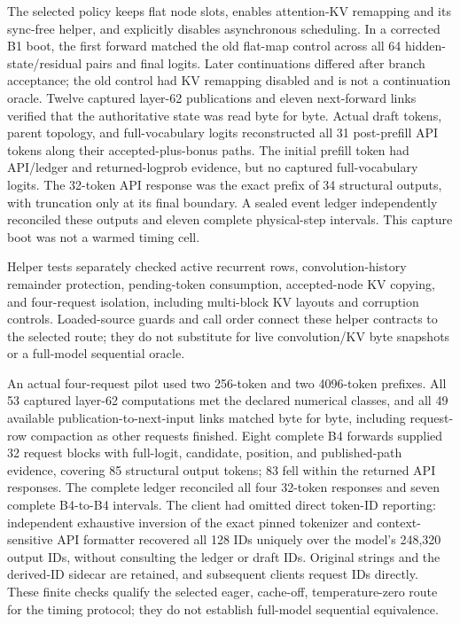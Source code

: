 \documentclass[conference]{IEEEtran}
\begin{document}
The selected policy keeps flat node slots, enables attention-KV remapping and its sync-free helper, and explicitly disables asynchronous scheduling. In a corrected B1 boot, the first forward matched the old flat-map control across all 64 hidden-state/residual pairs and final logits. Later continuations differed after branch acceptance; the old control had KV remapping disabled and is not a continuation oracle. Twelve captured layer-62 publications and eleven next-forward links verified that the authoritative state was read byte for byte. Actual draft tokens, parent topology, and full-vocabulary logits reconstructed all 31 post-prefill API tokens along their accepted-plus-bonus paths. The initial prefill token had API/ledger and returned-logprob evidence, but no captured full-vocabulary logits. The 32-token API response was the exact prefix of 34 structural outputs, with truncation only at its final boundary. A sealed event ledger independently reconciled these outputs and eleven complete physical-step intervals. This capture boot was not a warmed timing cell.

Helper tests separately checked active recurrent rows, convolution-history remainder protection, pending-token consumption, accepted-node KV copying, and four-request isolation, including multi-block KV layouts and corruption controls. Loaded-source guards and call order connect these helper contracts to the selected route; they do not substitute for live convolution/KV byte snapshots or a full-model sequential oracle.

An actual four-request pilot used two 256-token and two 4096-token prefixes. All 53 captured layer-62 computations met the declared numerical classes, and all 49 available publication-to-next-input links matched byte for byte, including request-row compaction as other requests finished. Eight complete B4 forwards supplied 32 request blocks with full-logit, candidate, position, and published-path evidence, covering 85 structural output tokens; 83 fell within the returned API responses. The complete ledger reconciled all four 32-token responses and seven complete B4-to-B4 intervals. The client had omitted direct token-ID reporting: independent exhaustive inversion of the exact pinned tokenizer and context-sensitive API formatter recovered all 128 IDs uniquely over the model's 248,320 output IDs, without consulting the ledger or draft IDs. Original strings and the derived-ID sidecar are retained, and subsequent clients request IDs directly. These finite checks qualify the selected eager, cache-off, temperature-zero route for the timing protocol; they do not establish full-model sequential equivalence.
\end{document}
